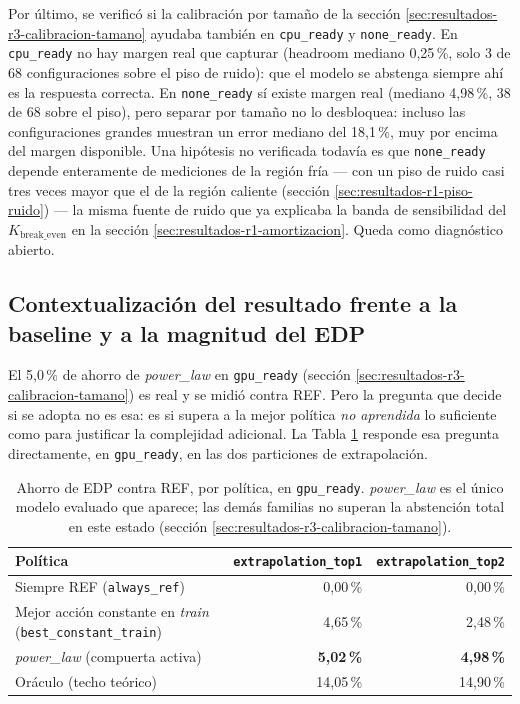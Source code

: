 \documentclass[12pt,oneside,spanish]{book}
\begin{document}
Por último, se verificó si la calibración por tamaño de la sección \ref{sec:resultados-r3-calibracion-tamano} ayudaba también en \texttt{cpu\_ready} y \texttt{none\_ready}. En \texttt{cpu\_ready} no hay margen real que capturar (headroom mediano 0,25\,\%, solo 3 de 68 configuraciones sobre el piso de ruido): que el modelo se abstenga siempre ahí es la respuesta correcta. En \texttt{none\_ready} sí existe margen real (mediano 4,98\,\%, 38 de 68 sobre el piso), pero separar por tamaño no lo desbloquea: incluso las configuraciones grandes muestran un error mediano del 18,1\,\%, muy por encima del margen disponible. Una hipótesis no verificada todavía es que \texttt{none\_ready} depende enteramente de mediciones de la región fría --- con un piso de ruido casi tres veces mayor que el de la región caliente (sección \ref{sec:resultados-r1-piso-ruido}) --- la misma fuente de ruido que ya explicaba la banda de sensibilidad del $K_{\text{break\_even}}$ en la sección \ref{sec:resultados-r1-amortizacion}. Queda como diagnóstico abierto.

\subsection{Contextualización del resultado frente a la baseline y a la magnitud del EDP}
\label{sec:resultados-r3-contextualizacion}

El 5,0\,\% de ahorro de \textit{power\_law} en \texttt{gpu\_ready} (sección \ref{sec:resultados-r3-calibracion-tamano}) es real y se midió contra REF. Pero la pregunta que decide si se adopta no es esa: es si supera a la mejor política \emph{no aprendida} lo suficiente como para justificar la complejidad adicional. La Tabla \ref{tab:r3-contextualizacion} responde esa pregunta directamente, en \texttt{gpu\_ready}, en las dos particiones de extrapolación.

\begin{table}[H]
\centering
\caption[Ahorro contra REF por política, gpu\_ready]{Ahorro de EDP contra REF, por política, en \texttt{gpu\_ready}. \textit{power\_law} es el único modelo evaluado que aparece; las demás familias no superan la abstención total en este estado (sección \ref{sec:resultados-r3-calibracion-tamano}).}
\label{tab:r3-contextualizacion}
\begin{tabular}{lrr}
\toprule
\textbf{Política} & \texttt{extrapolation\_top1} & \texttt{extrapolation\_top2} \\
\midrule
Siempre REF (\texttt{always\_ref})                  & 0,00\,\%  & 0,00\,\%  \\
Mejor acción constante en \textit{train} (\texttt{best\_constant\_train}) & 4,65\,\%  & 2,48\,\%  \\
\textit{power\_law} (compuerta activa)              & \textbf{5,02\,\%} & \textbf{4,98\,\%} \\
Oráculo (techo teórico)                             & 14,05\,\% & 14,90\,\% \\
\bottomrule
\end{tabular}
\end{table}
\end{document}
